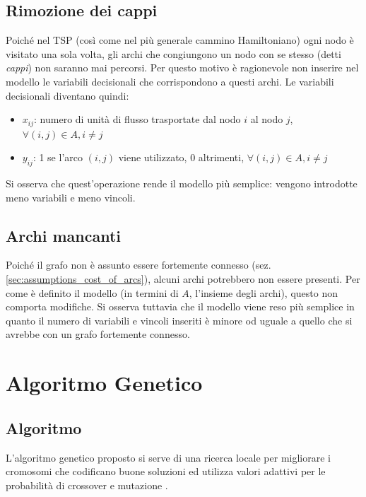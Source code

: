 \documentclass[a4paper, 10pt]{report}
\begin{document}
\section{Rimozione dei cappi}
\label{sec:pli_selfloops}
Poiché nel TSP (così come nel più generale cammino Hamiltoniano) ogni
nodo è visitato una sola volta, gli archi che congiungono un nodo con se
stesso (detti \emph{cappi}) non saranno mai percorsi. Per questo motivo
è ragionevole non inserire nel modello le variabili decisionali che
corrispondono a questi archi. Le variabili decisionali diventano quindi:
\begin{itemize}
  \item $x_{ij}$: numero di unità di flusso trasportate dal nodo $i$ al
        nodo $j$, $\forall (i, j) \in A, i \neq j$
  \item $y_{ij}$: 1 se l'arco $(i, j)$ viene utilizzato, 0 altrimenti,
        \mbox{$\forall (i, j) \in A, i \neq j$}
\end{itemize}
Si osserva che quest'operazione rende il modello più semplice: vengono
introdotte meno variabili e meno vincoli.



\section{Archi mancanti}
\label{sec:pli_missingarcs}
Poiché il grafo non è assunto essere fortemente connesso (sez.
\ref{sec:assumptions_cost_of_arcs}), alcuni archi potrebbero non essere presenti.
Per come è definito il modello (in termini di $A$, l'insieme degli archi),
questo non comporta modifiche. Si osserva tuttavia che il modello viene
reso più semplice in quanto il numero di variabili e vincoli inseriti
è minore od uguale a quello che si avrebbe con un grafo fortemente
connesso.



\chapter{Algoritmo Genetico}

\section{Algoritmo}
L'algoritmo genetico proposto si serve di una ricerca locale per migliorare
i cromosomi che codificano buone soluzioni ed utilizza valori adattivi
per le probabilità di crossover e mutazione \cite[Laoufi et al.]{laoufi}.
\end{document}
